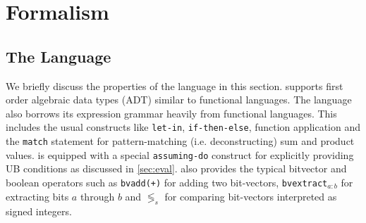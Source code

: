 \section{Formalism}
\label{sec:formalism}
\subsection{The \SpecL{} Language}
\label{sec:speclang}
We briefly discuss the properties of the \SpecL{} language in this section.
\SpecL{} supports first order algebraic data types (ADT) similar to functional languages.
The language also borrows its expression grammar heavily from functional languages.
This includes the usual constructs like {\tt let-in}, {\tt if-then-else}, function application and the {\tt match} statement
for pattern-matching (i.e. deconstructing) sum and product values.
\SpecL{} is equipped with a special {\tt assuming-do} construct for explicitly providing UB conditions as discussed in \cref{sec:eval}.
\SpecL{} also provides the typical bitvector and boolean operators such as {\tt bvadd(+)} for adding two bit-vectors, {\tt bvextract$_{a:b}$}
for extracting bits $a$ through $b$ and {\tt $\lessgtr_{s}$} for comparing bit-vectors interpreted as signed integers.


